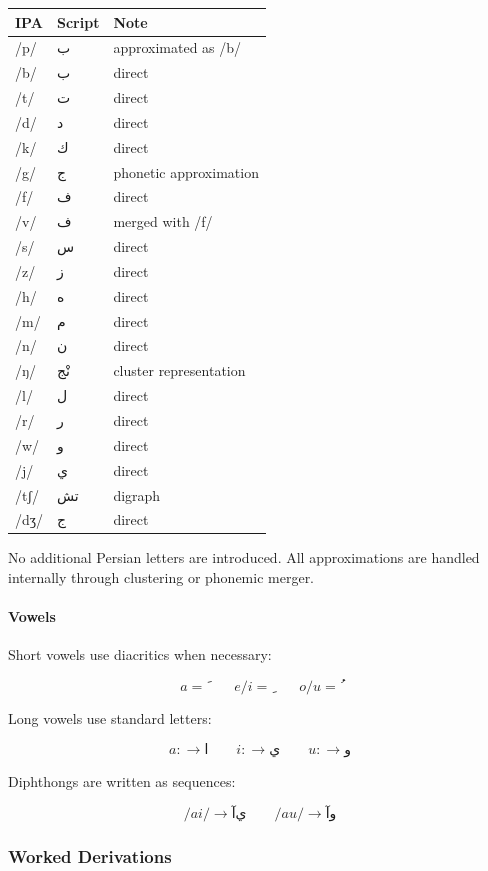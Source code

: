 \documentclass[12pt]{article}
\begin{document}
\begin{center}
\begin{tabular}{lll}
IPA & Script & Note \\
\hline
/p/ & ب & approximated as /b/ \\
/b/ & ب & direct \\
/t/ & ت & direct \\
/d/ & د & direct \\
/k/ & ك & direct \\
/g/ & ج & phonetic approximation \\
/f/ & ف & direct \\
/v/ & ف & merged with /f/ \\
/s/ & س & direct \\
/z/ & ز & direct \\
/h/ & ه & direct \\
/m/ & م & direct \\
/n/ & ن & direct \\
/ŋ/ & نْج & cluster representation \\
/l/ & ل & direct \\
/r/ & ر & direct \\
/w/ & و & direct \\
/j/ & ي & direct \\
/tʃ/ & تش & digraph \\
/dʒ/ & ج & direct \\
\end{tabular}
\end{center}

No additional Persian letters are introduced. All approximations are handled internally through clustering or phonemic merger.

\paragraph{Vowels}

Short vowels use diacritics when necessary:

\[
a = َ \qquad e/i = ِ \qquad o/u = ُ
\]

Long vowels use standard letters:

\[
a: \rightarrow ا \qquad i: \rightarrow ي \qquad u: \rightarrow و
\]

Diphthongs are written as sequences:

\[
/ai/ \rightarrow آي \qquad /au/ \rightarrow آو
\]

\subsubsection{Worked Derivations}
\end{document}
